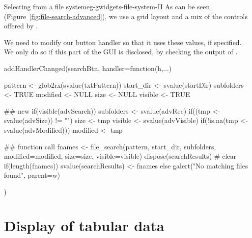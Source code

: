 \begin{example}{Selecting from a file system}{eg-gwidgets-file-system-II}
As can be seen (Figure~\ref{fig:file-search-advanced}), we use a grid
layout and a mix of the controls offered by .



We need to modify our button handler so that it uses these values, if
specified. We only do so if this part of the GUI is disclosed, by
checking the output of .

\begin{Schunk}
\begin{Sinput}
 addHandlerChanged(searchBtn, handler=function(h,...) {
   pattern <- glob2rx(svalue(txtPattern))
   start_dir <- svalue(startDir)
   subfolders <- TRUE
   modified <- NULL
   size <- NULL
   visible <- TRUE
 
   ## new
   if(visible(advSearch)) {
     subfolders <- svalue(advRec)
     if((tmp <- svalue(advSize)) != "") size <- tmp
     visible <- svalue(advVisible)
     if(!is.na(tmp <- svalue(advModified))) modified <- tmp
   }
   
   ## function call
   fnames <- file_search(pattern, start_dir, subfolders, 
                         modified=modified,
                         size=size, visible=visible)
   dispose(searchResults)                # clear
   if(length(fnames))
     svalue(searchResults) <- fnames
   else
     galert("No matching files found", parent=w)
 })
\end{Sinput}
\end{Schunk}




\end{example}


\section{Display of tabular data}
\label{sec:gWidgets-tabular-data-display}


